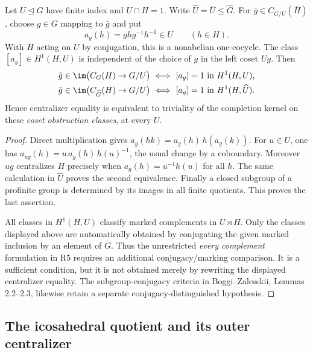 Let \(U\trianglelefteq G\) have finite index and \(U\cap H=1\). Write
\(\widehat U=\overline U\leq\widehat G\). For
\(\bar g\in C_{G/U}(\bar H)\), choose \(g\in G\) mapping to \(\bar g\) and put
\[
 a_g(h)=ghg^{-1}h^{-1}\in U\qquad(h\in H).
\]
With \(H\) acting on \(U\) by conjugation, this is a nonabelian
one-cocycle. The class \([a_g]\in H^1(H,U)\) is independent of the
choice of \(g\) in the left coset \(Ug\). Then
\[
\begin{split}
 \bar g\in\im\bigl(C_G(H)\to G/U\bigr)
 &\ \Longleftrightarrow\ [a_g]=1\text{ in }H^1(H,U),\\
 \bar g\in\im\bigl(C_{\widehat G}(H)\to G/U\bigr)
 &\ \Longleftrightarrow\ [a_g]=1\text{ in }H^1(H,\widehat U).
\end{split}
\]
Hence centralizer equality is equivalent to triviality of the completion
kernel on these \emph{coset obstruction classes}, at every \(U\).
\begin{proof}
Direct multiplication gives
\(a_g(hk)=a_g(h)\,h(a_g(k))\). For \(u\in U\), one has
\(a_{ug}(h)=u\,a_g(h)\,h(u)^{-1}\), the usual change by a coboundary.
Moreover \(ug\) centralizes \(H\) precisely when
\(a_g(h)=u^{-1}h(u)\) for all \(h\). The same calculation in
\(\widehat U\) proves the second equivalence. Finally a closed subgroup
of a profinite group is determined by its images in all finite
quotients. This proves the last assertion.

All classes in \(H^1(H,U)\) classify marked complements in \(U\rtimes H\).
Only the classes displayed above are automatically obtained by conjugating
the given marked inclusion by an element of \(G\). Thus the unrestricted
\emph{every complement} formulation in R5 requires an additional
conjugacy/marking comparison. It is a sufficient condition, but it is
not obtained merely by rewriting the displayed centralizer equality.
The subgroup-conjugacy criteria in Boggi--Zalesskii, Lemmas 2.2--2.3,
likewise retain a separate conjugacy-distinguished hypothesis.
\end{proof}

\subsection*{The icosahedral quotient and its outer centralizer}

